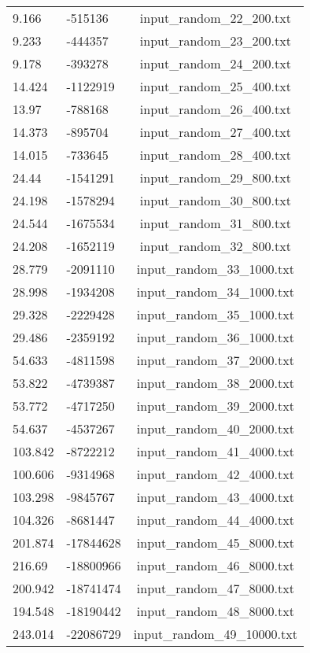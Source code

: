 \begin{longtable}[hb]{|l|l|c|}
    9.166 & -515136 & input\_random\_22\_200.txt \\
    9.233 & -444357 & input\_random\_23\_200.txt \\
    9.178 & -393278 & input\_random\_24\_200.txt \\
    14.424 & -1122919 & input\_random\_25\_400.txt \\
    13.97 & -788168 & input\_random\_26\_400.txt \\
    14.373 & -895704 & input\_random\_27\_400.txt \\
    14.015 & -733645 & input\_random\_28\_400.txt \\
    24.44 & -1541291 & input\_random\_29\_800.txt \\
    24.198 & -1578294 & input\_random\_30\_800.txt \\
    24.544 & -1675534 & input\_random\_31\_800.txt \\
    24.208 & -1652119 & input\_random\_32\_800.txt \\
    28.779 & -2091110 & input\_random\_33\_1000.txt \\
    28.998 & -1934208 & input\_random\_34\_1000.txt \\
    29.328 & -2229428 & input\_random\_35\_1000.txt \\
    29.486 & -2359192 & input\_random\_36\_1000.txt \\
    54.633 & -4811598 & input\_random\_37\_2000.txt \\
    53.822 & -4739387 & input\_random\_38\_2000.txt \\
    53.772 & -4717250 & input\_random\_39\_2000.txt \\
    54.637 & -4537267 & input\_random\_40\_2000.txt \\
    103.842 & -8722212 & input\_random\_41\_4000.txt \\
    100.606 & -9314968 & input\_random\_42\_4000.txt \\
    103.298 & -9845767 & input\_random\_43\_4000.txt \\
    104.326 & -8681447 & input\_random\_44\_4000.txt \\
    201.874 & -17844628 & input\_random\_45\_8000.txt \\
    216.69 & -18800966 & input\_random\_46\_8000.txt \\
    200.942 & -18741474 & input\_random\_47\_8000.txt \\
    194.548 & -18190442 & input\_random\_48\_8000.txt \\
    243.014 & -22086729 & input\_random\_49\_10000.txt \\

\end{longtable}
